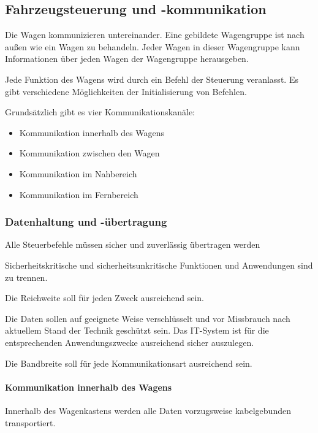 \subsection{Fahrzeugsteuerung und -kommunikation}
Die Wagen kommunizieren untereinander. Eine gebildete Wagengruppe ist nach außen wie ein Wagen zu behandeln. Jeder Wagen in dieser Wagengruppe kann Informationen über jeden Wagen der Wagengruppe herausgeben.\par
Jede Funktion des Wagens wird durch ein Befehl der Steuerung veranlasst. Es gibt verschiedene Möglichkeiten der Initialisierung von Befehlen.\par
Grundsätzlich gibt es vier Kommunikationskanäle:
\begin{itemize}
    \item Kommunikation innerhalb des Wagens
    \item Kommunikation zwischen den Wagen
    \item Kommunikation im Nahbereich
    \item Kommunikation im Fernbereich
\end{itemize}

\subsubsection{Datenhaltung und -übertragung}
\begin{feat}
Alle Steuerbefehle müssen sicher und zuverlässig übertragen werden
\end{feat}
\begin{feat}
Sicherheitskritische und sicherheitsunkritische Funktionen und Anwendungen sind zu trennen.
\end{feat}
\begin{feat}
Die Reichweite soll für jeden Zweck ausreichend sein.%
\end{feat}
\begin{feat}
Die Daten sollen auf geeignete Weise verschlüsselt und vor Missbrauch nach aktuellem Stand der Technik geschützt sein.
Das IT-System ist für die entsprechenden Anwendungszwecke ausreichend sicher auszulegen.
\end{feat}
\begin{feat}
Die Bandbreite soll für jede Kommunikationsart ausreichend sein.
\end{feat}

\paragraph{Kommunikation innerhalb des Wagens}
\begin{feat}
Innerhalb des Wagenkastens werden alle Daten vorzugsweise kabelgebunden transportiert. 
\end{feat}

